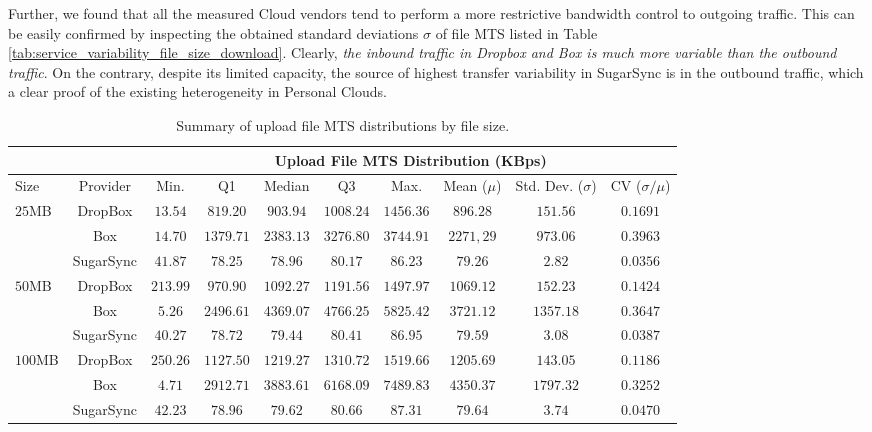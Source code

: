 Further, we found that all the measured Cloud vendors tend to perform a more restrictive
bandwidth control to outgoing traffic. This can be easily confirmed
by inspecting the obtained standard deviations $\sigma$ of file MTS 
listed in Table \ref{tab:service_variability_file_size_download}. Clearly,
\textit{the inbound traffic in Dropbox and Box is much more variable than the outbound traffic}. 
On the contrary, despite its limited capacity, the source of highest
transfer variability in SugarSync is in the outbound traffic, which a clear
proof of the existing heterogeneity in Personal Clouds.


\begin{table}[t]
\renewcommand{\arraystretch}{1}\addtolength{\tabcolsep}{-3pt}
\tiny
\centering
\begin{tabular}{|p{0.65cm}|c|c|c|c|c|c|c|c|c|}
\hline

& & \multicolumn{8}{|c|}{Upload File MTS Distribution (KBps)} \\

\hline
Size 		& Provider & Min. & Q1 & Median & Q3 & Max. & Mean ($\mu$) & Std. Dev. ($\sigma$) & CV ($\sigma/\mu$) \\ \hline
\multirow{3}{*}{$25$MB} 
 & DropBox & $13.54$ & $819.20$ & $903.94$ & $1008.24$ & $1456.36$ & $896.28$ & $151.56$ & $0.1691$  \\
 & Box & $14.70$ & $1379.71$ & $2383.13$ & $3276.80$ & $3744.91$ & $2271,29$ & $973.06$ & $0.3963$  \\
 & SugarSync & $41.87$ & $78.25$ & $78.96$ & $80.17$ & $86.23$ & $79.26$ & $2.82$ & $0.0356$  \\ \hline
 								
\multirow{3}{*}{$50$MB} 
 & DropBox & $213.99$ & $970.90$ & $1092.27$ & $1191.56$ & $1497.97$ & $1069.12$ & $152.23$ & $0.1424$  \\
 & Box & $5.26$ & $2496.61$ & $4369.07$ & $4766.25$ & $5825.42$ & $3721.12$ & $1357.18$ & $0.3647$  \\
 & SugarSync & $40.27$ & $78.72$ & $79.44$ & $80.41$ & $86.95$ & $79.59$ & $3.08$ & $0.0387$  \\ \hline
 								
\multirow{3}{*}{$100$MB} 
 & DropBox & $250.26$ & $1127.50$ & $1219.27$ & $1310.72$ & $1519.66$ & $1205.69$ & $143.05$ & $0.1186$  \\
 & Box & $4.71$ & $2912.71$ & $3883.61$ & $6168.09$ & $7489.83$ & $4350.37$ & $1797.32$ & $0.3252$  \\ 
 & SugarSync & $42.23$ & $78.96$ & $79.62$ & $80.66$ & $87.31$ & $79.64$ & $3.74$ & $0.0470$  \\ \hline
 
\end{tabular}
\caption{Summary of upload file MTS distributions by file size.}
\label{tab:service_variability_file_size_upload}
\end{table}

